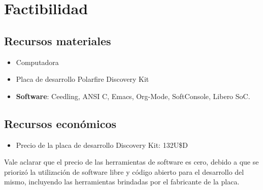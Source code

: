 
\section{Factibilidad}
\label{sec:factibilidad}

\subsection{Recursos materiales}
\label{sec:recursos-materiales}

\begin{itemize}
\item Computadora
\item Placa de desarrollo Polarfire Discovery Kit
\item \textbf{Software}: Ceedling, ANSI C, Emacs, Org-Mode, SoftConsole\textregistered, Libero SoC\textregistered.
\end{itemize}

\subsection{Recursos económicos}
\label{sec:recursos-economicos}

\begin{itemize}
\item Precio de la placa de desarrollo Discovery Kit: 132U\$D
\end{itemize}

\vspace{0.5  cm}\par Vale aclarar que el precio de las herramientas de software es cero, debido a que se priorizó la utilización de software libre y código abierto para el desarrollo del mismo, incluyendo las herramientas brindadas por el fabricante de la placa.

